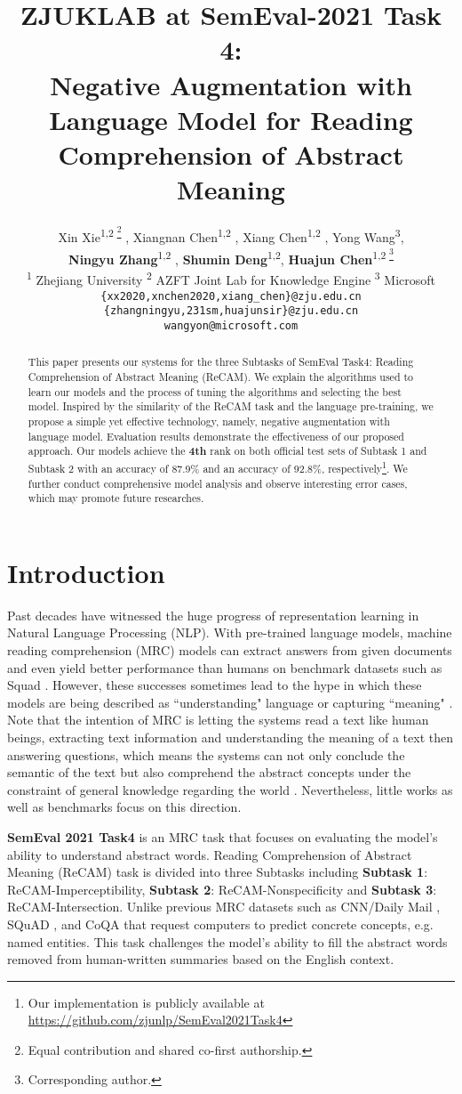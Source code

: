 \documentclass[11pt,a4paper]{article}
\title{ZJUKLAB at SemEval-2021 Task 4:\\ Negative Augmentation with Language Model for Reading Comprehension of Abstract Meaning}
\author{
Xin Xie\textsuperscript{\rm 1,2 \thanks{ Equal contribution and shared co-first authorship.} },  Xiangnan Chen\textsuperscript{\rm 1,2 \footnotemark[1]} , Xiang Chen\textsuperscript{\rm 1,2 \footnotemark[1]} , 
Yong Wang\textsuperscript{\rm 3}, \\ \textbf{Ningyu Zhang}\textsuperscript{\rm 1,2 \dag}, \textbf{Shumin Deng}\textsuperscript{\rm 1,2}, \textbf{Huajun Chen}\textsuperscript{\rm 1,2 \footnote{Corresponding author.}} \\
	\textsuperscript{\rm 1} Zhejiang University 
	\textsuperscript{\rm 2} AZFT Joint Lab for Knowledge Engine 
	\textsuperscript{\rm 3} Microsoft \\
	\texttt{\{xx2020,xnchen2020,xiang\_chen\}@zju.edu.cn} \\
	\texttt{\{zhangningyu,231sm,huajunsir\}@zju.edu.cn} \\
	\texttt{wangyon@microsoft.com}
}
\date{}
\begin{document}
\maketitle



\begin{abstract}
This paper presents our systems for the three Subtasks of SemEval Task4: Reading Comprehension of Abstract Meaning (ReCAM). We explain the algorithms used to learn our models and the process of tuning the algorithms and selecting the best model. Inspired by the similarity of the ReCAM task and the language pre-training, we propose a simple yet effective technology, namely, negative augmentation with language model. Evaluation results demonstrate the effectiveness of our proposed approach. Our models achieve the \textbf{4th} rank on both official test sets of Subtask 1 and Subtask 2 with an accuracy of 87.9\% and an accuracy of 92.8\%, respectively\footnote{Our implementation is publicly available at \url{https://github.com/zjunlp/SemEval2021Task4}}. We further conduct comprehensive model analysis and observe interesting error cases, which may promote future researches.
\end{abstract}

\section{Introduction}
Past decades have witnessed the huge progress of representation learning in Natural Language Processing (NLP). 
With pre-trained language models, machine reading comprehension (MRC) models can extract answers from given documents and even yield better performance than humans on benchmark datasets such as Squad  \cite{rajpurkar-etal-2016-squad}. 
However, these successes sometimes lead to the hype in which these models are being described as ``understanding" language or capturing ``meaning" \cite{bender-koller-2020-climbing}. 
Note that the intention of MRC is letting the systems read a text like human beings, extracting text information and understanding the meaning of a text then answering questions, which means the systems can not only conclude the semantic of the text but also comprehend the abstract concepts under the constraint of general knowledge regarding the world \cite{DBLP:journals/corr/WangJ16a}. Nevertheless, little works as well as benchmarks focus on this direction. 

\textbf{SemEval 2021 Task4} \cite{zheng-2021-semeval-task4} is an MRC  task that focuses on evaluating the model's ability to understand abstract words.
Reading Comprehension of Abstract Meaning (ReCAM) task is divided into three Subtasks including \textbf{Subtask 1}: ReCAM-Imperceptibility, \textbf{Subtask 2}: ReCAM-Nonspecificity and \textbf{Subtask 3}: ReCAM-Intersection.
Unlike previous MRC datasets such as CNN/Daily Mail \cite{hermann_teaching_2015}, SQuAD \cite{squad}, and CoQA \cite{coqa} that request computers to predict concrete concepts, e.g. named entities. This task challenges the model's ability to fill the abstract words removed from human-written summaries based on the English context.
\end{document}
